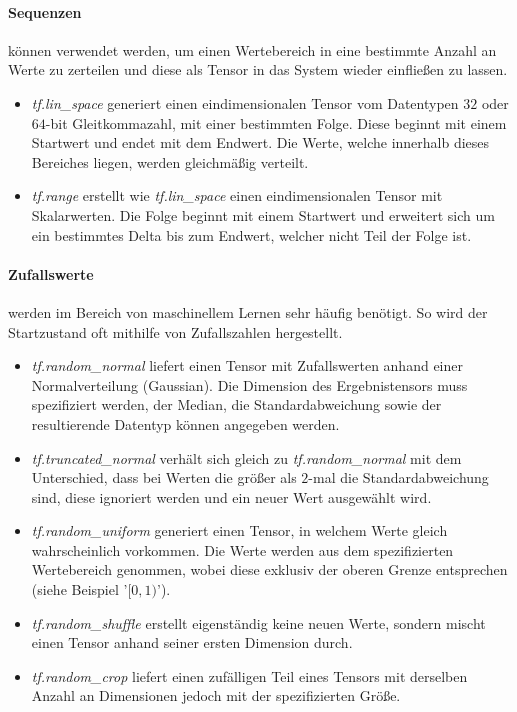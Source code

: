 \paragraph{Sequenzen} können verwendet werden, um einen Wertebereich in eine bestimmte Anzahl an Werte zu zerteilen und diese als Tensor in das System wieder einfließen zu lassen.

\begin{itemize}
	\item \textit{tf.lin\_space} generiert einen eindimensionalen Tensor vom Datentypen $32$ oder $64$-bit Gleitkommazahl, mit einer bestimmten Folge.
	Diese beginnt mit einem Startwert und endet mit dem Endwert. 
	Die Werte, welche innerhalb dieses Bereiches liegen, werden gleichmäßig verteilt. 
	\item \textit{tf.range} erstellt wie \textit{tf.lin\_space} einen eindimensionalen Tensor mit Skalarwerten. 
	Die Folge beginnt mit einem Startwert und erweitert sich um ein bestimmtes Delta bis zum Endwert, welcher nicht Teil der Folge ist. 
\end{itemize}

\paragraph{Zufallswerte} werden im Bereich von maschinellem Lernen sehr häufig benötigt. 
So wird der Startzustand oft mithilfe von Zufallszahlen hergestellt. 

\begin{itemize}
	\item \textit{tf.random\_normal} liefert einen Tensor mit Zufallswerten anhand einer Normalverteilung (Gaussian). 
	Die Dimension des Ergebnistensors muss spezifiziert werden, der Median, die Standardabweichung sowie der resultierende Datentyp können angegeben werden. 
	\item \textit{tf.truncated\_normal} verhält sich gleich zu \textit{tf.random\_normal} mit dem Unterschied, dass bei Werten die größer als $2$-mal die Standardabweichung sind, diese ignoriert werden und ein neuer Wert ausgewählt wird.
	\item \textit{tf.random\_uniform} generiert einen Tensor, in welchem Werte gleich wahrscheinlich vorkommen.
	Die Werte werden aus dem spezifizierten Wertebereich genommen, wobei diese exklusiv der oberen Grenze entsprechen (siehe Beispiel '$[0, 1)$').
	\item \textit{tf.random\_shuffle} erstellt eigenständig keine neuen Werte, sondern mischt einen Tensor anhand seiner ersten Dimension durch. 
	\item \textit{tf.random\_crop} liefert einen zufälligen Teil eines Tensors mit derselben Anzahl an Dimensionen jedoch mit der spezifizierten Größe.
\end{itemize} \phantom \newline

